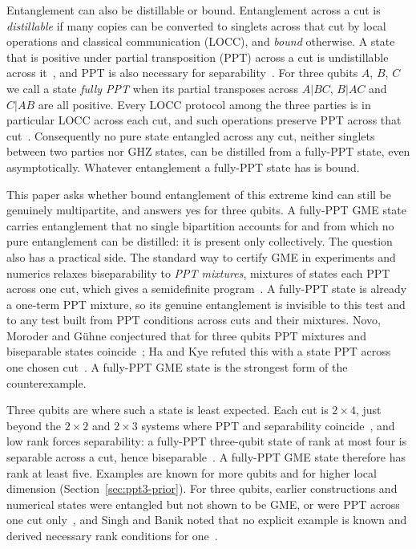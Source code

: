 \documentclass[11pt]{article}
\theoremstyle{remark}
\begin{document}
Entanglement can also be distillable or bound. Entanglement across a cut is \emph{distillable} if many copies can
be converted to singlets across that cut by local operations and classical communication (LOCC), and \emph{bound}
otherwise. A state that is positive under partial transposition (PPT) across a cut is undistillable across it~\cite{HHH98},
and PPT is also necessary for separability~\cite{Peres,HHH96}. For three qubits $A$, $B$, $C$ we call a state
\emph{fully PPT} when its partial transposes across $A|BC$, $B|AC$ and $C|AB$ are all positive. Every LOCC protocol among
the three parties is in particular LOCC across each cut, and such operations preserve PPT across that cut~\cite{HHH98,HHH09}.
Consequently no pure state entangled across any cut, neither singlets between two parties nor GHZ states, can be
distilled from a fully-PPT state, even asymptotically.
Whatever entanglement a fully-PPT state has is bound.

This paper asks whether bound entanglement of this extreme kind can still be genuinely multipartite, and answers yes
for three qubits. A fully-PPT GME state carries entanglement that no single bipartition accounts for and from which no
pure entanglement can be distilled: it is present only collectively. The question also has a practical side. The standard
way to certify GME in experiments and numerics relaxes biseparability to \emph{PPT mixtures}, mixtures of states each PPT
across one cut, which gives a semidefinite program~\cite{JMG,NMG}. A fully-PPT state is already a one-term PPT mixture,
so its genuine entanglement is invisible to this test and to any test built from PPT conditions across cuts and their
mixtures. Novo, Moroder and G\"uhne conjectured that for three qubits PPT mixtures and biseparable states coincide~\cite{NMG};
Ha and Kye refuted this with a state PPT across one chosen cut~\cite{HK}. A fully-PPT GME state is the strongest form of
the counterexample.

Three qubits are where such a state is least expected. Each cut is $2\times4$, just beyond the $2\times2$ and $2\times3$
systems where PPT and separability coincide~\cite{HHH96}, and low rank forces separability: a fully-PPT three-qubit
state of rank at most four is separable across a cut, hence biseparable~\cite{KCKL,HLVC,KL,ABLS}. A fully-PPT GME state therefore
has rank at least five. Examples are known for more qubits and for higher local dimension (Section~\ref{sec:ppt3-prior}).
For three qubits, earlier constructions and numerical states were entangled but not shown to be GME, or were PPT across
one cut only~\cite{HK,KRB,GIM}, and Singh and Banik noted that no explicit example is known and derived necessary
rank conditions for one~\cite{SB}.
\end{document}

